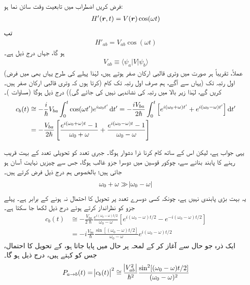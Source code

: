 فرض کریں اضطراب میں تابعیت وقت سائن نما ہو: 
\begin{align}
	H'({{\boldsymbol{r}}}, t) = V({{\boldsymbol{r}}})\cos(\omega t)
\end{align}
تب 
\begin{align}
	H'_{ab}=V_{ab}\cos(\omega t)
\end{align}
ہو گا، جہاں  درج ذیل ہے۔
\begin{align}
	V_{ab}\equiv\langle\psi_a| V|\psi_b\rangle
\end{align}
(عملاً، تقریباً ہر صورت میں وتری قالبی ارکان صفر ہوتے ہیں، لہٰذا پہلے کی طرح یہاں بھی میں فرض کرتا ہوں کہ وتری قالبی ارکان صفر ہیں۔) اول رتبہ تک (یہاں سے آگے، ہم صرف اول رتبہ تک کام کریں گے، لہٰذا زیر بالا میں رتبہ کی نشاندہی نہیں کی جائے گی)) درج ذیل ہوگا (مساوات )۔
\begin{align}\label{مساوات_تابع_مضطرب_دو_اجزاء}
	c_b(t) &\cong-\frac{i}{\hslash}V_{ba}\int_{0}^{t}\cos(\omega t')e^{i\omega_0 t'}\dif t' = -\frac{iV_{ba}}{2\hslash}\int_{0}^{t}\left[e^{i(\omega_0+\omega)t'}+e^{i(\omega_0-\omega)t'}\right]\dif t' \nonumber \\
	&=-\frac{V_{ba}}{2\hslash}\left[\frac{e^{i(\omega_0+\omega)t}-1}{\omega_0+\omega}+\frac{e^{i(\omega_0-\omega)t}-1}{\omega_0-\omega}\right]
\end{align}

یہی جواب ہے، لیکن اس کے ساتھ کام کرنا ذرا دشوار ہوگا۔ جبری تعدد  کو تحویلی تعدد  کے بہت قریب رہنے کا پابند بنانے سے، چوکور قوسین میں دوسرا جزو غالب ہوگا، جس سے چیزیں نہایت آسان ہو جاتی ہیں؛ بالخصوص ہم درج ذیل فرض کرتے ہیں۔
\begin{align}
	\omega_0+\omega\gg\abs{\omega_0-\omega}
\end{align}
یہ بہت بڑی پابندی نہیں ہے، چونکہ کسی دوسرے تعدد پر تحویل کا احتمال نہ ہونے کے برابر ہے۔ پہلے جزو کو نظرانداز کرتے ہوئے درج ذیل لکھا جا سکتا ہے۔
\begin{align}
	c_b(t) &\cong-\frac{V_{ba}}{2\hslash}\frac{e^{i(\omega_0-\omega)t/2}}{\omega_0-\omega}\left[e^{i(\omega_0-\omega)t/2}-e^{-i(\omega_0-\omega)t/2}\right]\nonumber \\
	&=-i\frac{V_{ba}}{\hslash}\frac{\sin[(\omega_0-\omega)t/2]}{\omega_0-\omega}e^{i(\omega_0-\omega)t/2}
\end{align}
ایک ذرہ جو حال  سے آغاز کر کے لمحہ پر حال  میں پایا جاتا ہو، کے تحویل کا احتمال، جس کو  کہتے ہیں، درج ذیل ہو گا۔
\begin{align}\label{مساوات_تابع_مضطرب_تحویلی_احتمال}
	P_{a\to b}(t)=\abs{c_b(t)}^2\cong\frac{\abs{V_{ab}^2}}{\hslash^2}\frac{\sin^2[(\omega_0-\omega)t/2]}{(\omega_0-\omega)^2}
\end{align}

